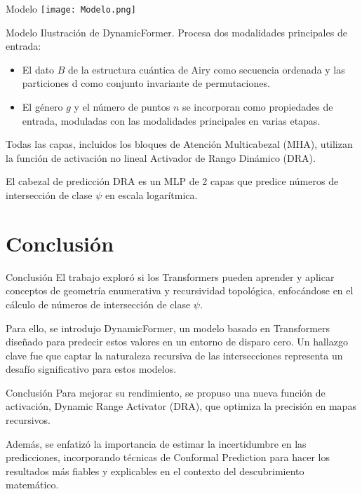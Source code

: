 \documentclass{beamer}
\begin{document}
\begin{frame}{Modelo}
    \texttt{[image: Modelo.png]}
\end{frame}

\begin{frame}{Modelo}
    Ilustración de DynamicFormer. Procesa dos modalidades principales de entrada: 
    \begin{itemize}
        \item El dato $B$ de la estructura cuántica de Airy como secuencia ordenada y las particiones d como conjunto invariante de permutaciones. 
        \item El género $g$ y el número de puntos $n$ se incorporan como propiedades de entrada, moduladas con las modalidades principales en varias etapas.
    \end{itemize}
    Todas las capas, incluidos los bloques de Atención Multicabezal (MHA), utilizan la función de activación no lineal Activador de Rango Dinámico (DRA).  
    \newline
    \pause
    
     El cabezal de predicción DRA es un MLP de 2 capas que predice números de intersección de clase $\psi$ en escala logarítmica.
\end{frame}

\section{Conclusión}
\begin{frame}{Conclusión}
    El trabajo exploró si los Transformers pueden aprender y aplicar conceptos de geometría enumerativa y recursividad topológica, enfocándose en el cálculo de números de intersección de clase $\psi$.
    \newline
    \pause
    
    Para ello, se introdujo DynamicFormer, un modelo basado en Transformers diseñado para predecir estos valores en un entorno de disparo cero. Un hallazgo clave fue que captar la naturaleza recursiva de las intersecciones representa un desafío significativo para estos modelos. 
\end{frame}

\begin{frame}{Conclusión}    
    Para mejorar su rendimiento, se propuso una nueva función de activación, Dynamic Range Activator (DRA), que optimiza la precisión en mapas recursivos. 
    \newline
    \pause
    
    Además, se enfatizó la importancia de estimar la incertidumbre en las predicciones, incorporando técnicas de Conformal Prediction para hacer los resultados más fiables y explicables en el contexto del descubrimiento matemático.
\end{frame}
\end{document}
